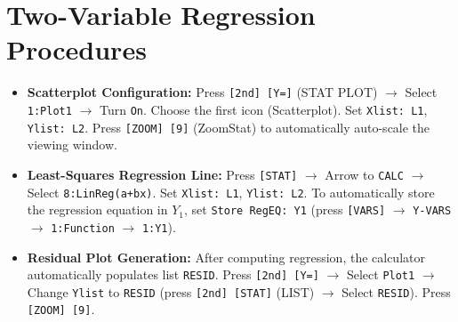 \section{Two-Variable Regression Procedures}
\begin{itemize}[leftmargin=1.5em]
  \item \textbf{Scatterplot Configuration:}
  Press \texttt{[2nd] [Y=]} (STAT PLOT) $\to$ Select \texttt{1:Plot1} $\to$ Turn \texttt{On}. Choose the first icon (Scatterplot). Set \texttt{Xlist: L1}, \texttt{Ylist: L2}. Press \texttt{[ZOOM] [9]} (ZoomStat) to automatically auto-scale the viewing window.
  \item \textbf{Least-Squares Regression Line:}
  Press \texttt{[STAT]} $\to$ Arrow to \texttt{CALC} $\to$ Select \texttt{8:LinReg(a+bx)}. Set \texttt{Xlist: L1}, \texttt{Ylist: L2}. To automatically store the regression equation in $Y_1$, set \texttt{Store RegEQ: Y1} (press \texttt{[VARS]} $\to$ \texttt{Y-VARS} $\to$ \texttt{1:Function} $\to$ \texttt{1:Y1}).
  \item \textbf{Residual Plot Generation:}
  After computing regression, the calculator automatically populates list \texttt{RESID}. Press \texttt{[2nd] [Y=]} $\to$ Select \texttt{Plot1} $\to$ Change \texttt{Ylist} to \texttt{RESID} (press \texttt{[2nd] [STAT]} (LIST) $\to$ Select \texttt{RESID}). Press \texttt{[ZOOM] [9]}.
\end{itemize}

